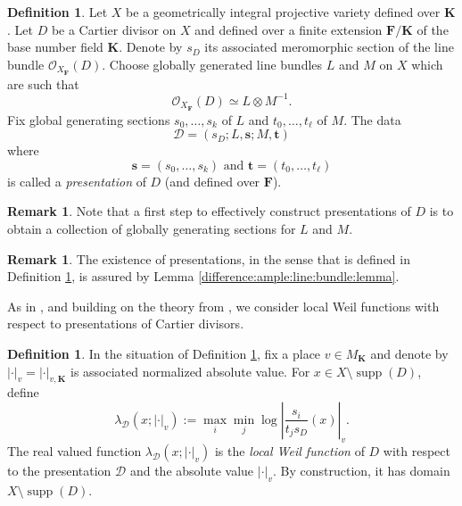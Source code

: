 \documentclass[10pt]{amsart}
\newcommand{\Osh}{{\mathcal O}}                        %
\newcommand{\KK}{\mathbf{K}}
\newcommand{\FF}{\mathbf{F}}
\theoremstyle{definition}
\newtheorem{defn}[theorem]{Definition}
\newtheorem{remark}[theorem]{Remark}
\numberwithin{equation}{section}
\begin{document}
\begin{defn}\label{presentation:Cartier:divisor:defn} Let $X$ be a geometrically integral projective variety defined over $\KK$.
Let $D$ be a Cartier divisor on $X$ and defined over a finite extension $\FF / \KK$ of the base number field $\KK$.  Denote by $s_D$ its associated meromorphic section of the line bundle $\Osh_{X_{\FF}}(D)$.
Choose globally generated line bundles $L$ and $M$ on $X$ which are such that 
$$\Osh_{X_{\FF}}(D) \simeq L \otimes M^{-1}\text{.}$$  
Fix global generating sections $s_0,\dots,s_k$ of $L$ and $t_0,\dots,t_\ell$ of $M$.  The data 
$$
\mathcal{D} = (s_D; L, \mathbf{s}; M, \mathbf{t})
$$
where 
$$\mathbf{s} = (s_0,\dots,s_k) \text{ and } \mathbf{t} = (t_0,\dots,t_\ell)$$ 
is called a \emph{presentation} of $D$ (and defined over $\FF$).
\end{defn}


\begin{remark}
Note that a first step to effectively construct presentations of $D$ is to obtain a collection of globally generating sections for $L$ and $M$.
\end{remark}


\begin{remark}
The existence of presentations, in the sense that is defined in Definition \ref{presentation:Cartier:divisor:defn}, is assured by Lemma \ref{difference:ample:line:bundle:lemma}.
\end{remark}

As in \cite{Grieve:qualitative:subspace}, and building on the theory from \cite[Section 2.2]{Bombieri:Gubler}, we consider local Weil functions with respect to presentations of Cartier divisors.

\begin{defn}\label{defn:local:Weil:function}
In the situation of Definition \ref{presentation:Cartier:divisor:defn},  fix a place $v \in M_{\KK}$ and denote by $|\cdot|_v = |\cdot|_{v,\KK}$ is associated normalized absolute value.   For $x \in X \setminus \operatorname{supp}(D)$, define
$$
\lambda_{\mathcal{D}}(x;|\cdot|_v) := \max_i \min_j \log \left| \frac{s_i}{t_j s_D}(x) \right|_v \text{.}
$$
The real valued function $\lambda_{\mathcal{D}}(x;|\cdot|_v)$ is the \emph{local Weil function} of $D$ with respect to the presentation $\mathcal{D}$ and the absolute value $|\cdot|_v$.  By construction, it has domain $X \setminus \operatorname{supp}(D)$.
\end{defn}
\end{document}
